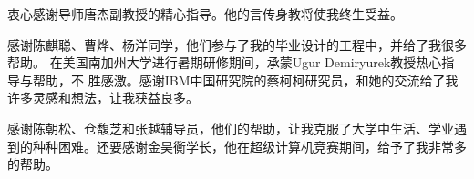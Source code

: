
\begin{ack}
  衷心感谢导师唐杰副教授的精心指导。他的言传身教将使我终生受益。

  感谢陈麒聪、曹烨、杨洋同学，他们参与了我的毕业设计的工程中，并给了我很多帮助。
  在美国南加州大学进行暑期研修期间，承蒙Ugur Demiryurek教授热心指导与帮助，不
  胜感激。感谢IBM中国研究院的蔡柯柯研究员，和她的交流给了我许多灵感和想法，让我获益良多。
  
  感谢陈朝松、仓馥芝和张越辅导员，他们的帮助，让我克服了大学中生活、学业遇到的种种困难。还要感谢金昊衠学长，他在超级计算机竞赛期间，给予了我非常多的帮助。
\end{ack}
